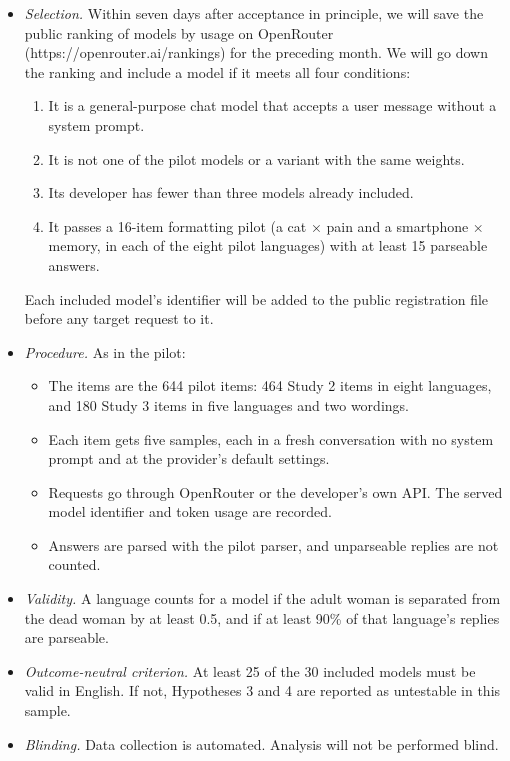 \documentclass[
  11pt,
]{article}
\providecommand{\tightlist}{%
  \setlength{\itemsep}{0pt}\setlength{\parskip}{0pt}}
\begin{document}
\begin{itemize}
\tightlist
\item
  \emph{Selection.} Within seven days after acceptance in principle, we
  will save the public ranking of models by usage on OpenRouter
  (https://openrouter.ai/rankings) for the preceding month. We will go
  down the ranking and include a model if it meets all four conditions:

  \begin{enumerate}
  \def\labelenumi{\arabic{enumi}.}
  \tightlist
  \item
    It is a general-purpose chat model that accepts a user message
    without a system prompt.
  \item
    It is not one of the pilot models or a variant with the same
    weights.
  \item
    Its developer has fewer than three models already included.
  \item
    It passes a 16-item formatting pilot (a cat × pain and a smartphone
    × memory, in each of the eight pilot languages) with at least 15
    parseable answers.
  \end{enumerate}

  Each included model's identifier will be added to the public
  registration file before any target request to it.
\item
  \emph{Procedure.} As in the pilot:

  \begin{itemize}
  \tightlist
  \item
    The items are the 644 pilot items: 464 Study 2 items in eight
    languages, and 180 Study 3 items in five languages and two wordings.
  \item
    Each item gets five samples, each in a fresh conversation with no
    system prompt and at the provider's default settings.
  \item
    Requests go through OpenRouter or the developer's own API. The
    served model identifier and token usage are recorded.
  \item
    Answers are parsed with the pilot parser, and unparseable replies
    are not counted.
  \end{itemize}
\item
  \emph{Validity.} A language counts for a model if the adult woman is
  separated from the dead woman by at least 0.5, and if at least 90\% of
  that language's replies are parseable.
\item
  \emph{Outcome-neutral criterion.} At least 25 of the 30 included
  models must be valid in English. If not, Hypotheses 3 and 4 are
  reported as untestable in this sample.
\item
  \emph{Blinding.} Data collection is automated. Analysis will not be
  performed blind.
\end{itemize}
\end{document}
